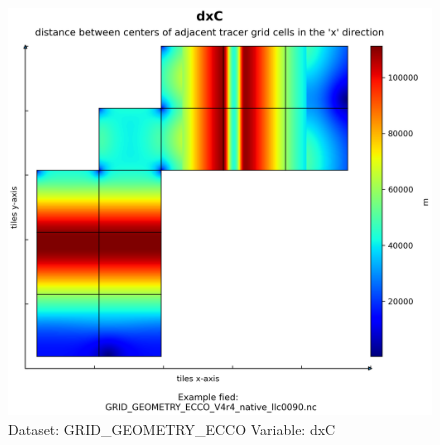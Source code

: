 \begin{figure}[H]
\centering
\includegraphics[width=\textwidth]{../images/plots/native_plots_coords/Geometry_Parameters_for_the_Lat-Lon-Cap_90_(llc90)_Native_Model_Grid_(Version_4_Release_4)/dxC.png}
\caption{Dataset: GRID\_GEOMETRY\_ECCO Variable: dxC}
\label{tab:table-GRID_GEOMETRY_ECCO_dxC-Plot}
\end{figure}
\pagebreak
